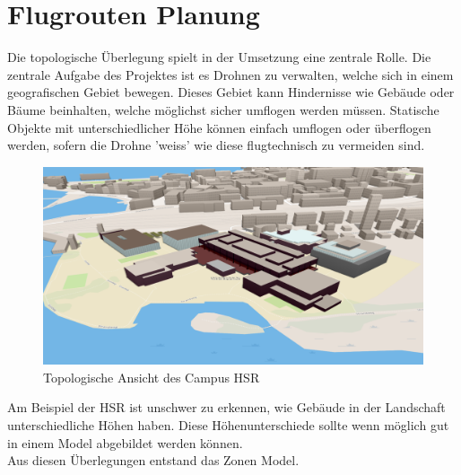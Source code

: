 \newpage
\section{Flugrouten Planung}
Die topologische Überlegung spielt in der Umsetzung eine zentrale Rolle.
Die zentrale Aufgabe des Projektes ist es Drohnen zu verwalten, welche sich in einem geografischen Gebiet bewegen. 
Dieses Gebiet kann Hindernisse wie Gebäude oder Bäume beinhalten, welche möglichst sicher umflogen werden müssen. 
Statische Objekte mit unterschiedlicher Höhe können einfach umflogen oder überflogen werden, sofern die Drohne 'weiss' wie diese flugtechnisch zu vermeiden sind. \\
\begin{figure}[H]
	\includegraphics[width=1.0\textwidth]{images/routing/topology_example.png}
	\caption{Topologische Ansicht des Campus HSR}
	\label{fig:campus-hsr}
\end{figure}
Am Beispiel der HSR ist unschwer zu erkennen, wie Gebäude in der Landschaft unterschiedliche Höhen haben. Diese Höhenunterschiede sollte wenn möglich gut in einem Model abgebildet werden können. \\
Aus diesen Überlegungen entstand das Zonen Model.

